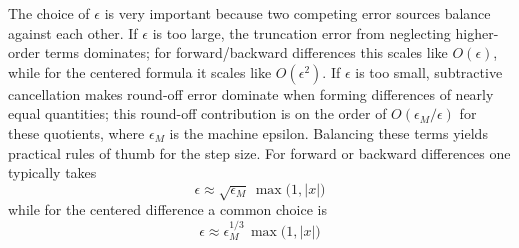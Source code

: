 The choice of \(\epsilon\) is very important because two competing error sources balance against each other. If \(\epsilon\) is too large, the truncation error from neglecting higher-order terms dominates; for forward/backward differences this scales like \(O(\epsilon)\), while for the centered formula it scales like \(O(\epsilon^2)\). If \(\epsilon\) is too small, subtractive cancellation makes round-off error dominate when forming differences of nearly equal quantities; this round-off contribution is on the order of \(O(\epsilon_M/\epsilon)\) for these quotients, where \(\epsilon_M\) is the machine epsilon. Balancing these terms yields practical rules of thumb for the step size. For forward or backward differences one typically takes
\[
  \epsilon \approx \sqrt{\epsilon_M}\,\max\!\bigl(1,\lvert x\rvert\bigr)
\]
while for the centered difference a common choice is
\[
  \epsilon \approx \epsilon_M^{1/3}\,\max\!\bigl(1,\lvert x\rvert\bigr)
\]

